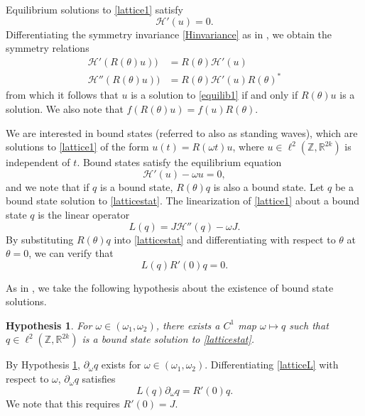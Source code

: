 \documentclass[12pt]{elsarticle}
\def\R{{\mathbb R}}
\def\Z{{\mathbb Z}}
\newtheorem{hypothesis}{Hypothesis}
\begin{document}
Equilibrium solutions to \eqref{lattice1} satisfy 
\begin{equation}\label{equilib1}
\mathcal{H}'(u) = 0.
\end{equation}
Differentiating the symmetry invariance \eqref{Hinvariance} as in \cite{Grillakis1987}, we obtain the symmetry relations
\begin{equation}\label{symmetryrel}
\begin{aligned}
\mathcal{H}'(R(\theta)u)) &= R(\theta) \mathcal{H}'(u) \\
\mathcal{H}''(R(\theta)u)) &= R(\theta) \mathcal{H}'(u) R(\theta)^*
\end{aligned}
\end{equation}
from which it follows that $u$ is a solution to \eqref{equilib1} if and only if $R(\theta)u$ is a solution. We also note that $f(R(\theta)u) = f(u)R(\theta)$.

We are interested in bound states (referred to also
as standing waves), which are solutions to \eqref{lattice1} of the form $u(t) = R(\omega t)u$, where $u \in \ell^2(\Z, \R^{2k})$ is independent of $t$. Bound states satisfy the equilibrium equation
\begin{equation}\label{latticestat}
\mathcal{H}'(u) - \omega u = 0,
\end{equation}
and we note that if $q$ is a bound state, $R(\theta)q$ is also a bound state. Let $q$ be a bound state solution to \eqref{latticestat}. The linearization of \eqref{lattice1} about a bound state $q$ is the linear operator
\begin{equation}\label{latticeL}
L(q) = J \mathcal{H}''(q) - \omega J.
\end{equation}
By substituting $R(\theta)q$ into \eqref{latticestat} and differentiating with respect to $\theta$ at $\theta = 0$, we can verify that 
\begin{equation}\label{Lkernel1}
L(q) R'(0) q = 0.
\end{equation}

\noindent As in \cite{Grillakis1987}, we take the following hypothesis about the existence of bound state solutions.
\begin{hypothesis}\label{boundstatehyp}
For $\omega \in (\omega_1, \omega_2)$, there exists a $C^1$ map $\omega \mapsto q$ such that $q \in \ell^2(\Z, \R^{2k})$ is a bound state solution to \eqref{latticestat}.
\end{hypothesis}

By Hypothesis \ref{boundstatehyp}, $\partial_\omega q$ exists for $\omega \in (\omega_1, \omega_2)$. Differentiating \eqref{latticeL} with respect to $\omega$, $\partial_\omega q$ satisfies 
\begin{equation}\label{Lkernel2}
L(q)\partial_\omega q = R'(0) q.
\end{equation}
We note that this requires $R'(0) = J$.
\end{document}
